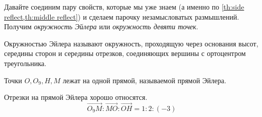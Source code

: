 Давайте соединим пару свойств, которые мы уже знаем (а именно по \cref{th:side reflect,th:middle reflect}) и сделаем парочку незамысловатых размышлений. Получим \emph{окружность Эйлера} или \emph{окружность девяти точек}.
\begin{definition}\label{def:euler's circle}
    Окружностью Эйлера называют окружность, проходящую через основания высот, середины сторон и середины отрезков, соединяющих вершины с ортоцентром треугольника.
\end{definition}
\begin{definition}\label{def:euler's line}
    Точки $O, O_9, H, M$ лежат на одной прямой, называемой прямой Эйлера.
\end{definition}
\begin{theorem} \label{th:euler's line ratios}
    Отрезки на прямой Эйлера хорошо относятся.\[\overrightarrow{O_9M} : \overrightarrow{MO}: \overrightarrow{OH} = 1 : 2 : (-3)\]
\end{theorem}

